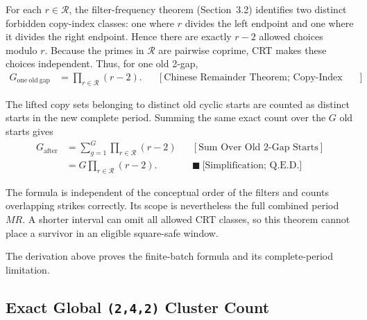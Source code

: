 For each $r\in\mathcal R$, the filter-frequency theorem (Section~3.2)
identifies two distinct forbidden copy-index classes: one where $r$
divides the left endpoint and one where it divides the right endpoint.
Hence there are exactly $r-2$ allowed choices modulo $r$. Because the
primes in $\mathcal R$ are pairwise coprime, CRT makes these choices
independent. Thus, for one old 2-gap,
\begin{equation*}
\begin{aligned}
G_{\mathrm{one\ old\ gap}}
&=\prod_{r\in\mathcal R}(r-2).
&&[\text{Chinese Remainder Theorem; Copy-Index Filter Frequency}]
\end{aligned}
\end{equation*}

The lifted copy sets belonging to distinct old cyclic starts are counted
as distinct starts in the new complete period. Summing the same exact
count over the $G$ old starts gives
\begin{equation*}
\begin{aligned}
G_{\mathrm{after}}
&=\sum_{g=1}^{G}
  \prod_{r\in\mathcal R}(r-2)
&&[\text{Sum Over Old 2-Gap Starts}]\\
&=G\prod_{r\in\mathcal R}(r-2).
&&\blacksquare\ \text{[Simplification; Q.E.D.]}
\end{aligned}
\end{equation*}

The formula is independent of the conceptual order of the filters and
counts overlapping strikes correctly. Its scope is nevertheless the full
combined period $MR$. A shorter interval can omit all allowed CRT
classes, so this theorem cannot place a survivor in an eligible
square-safe window.

{\raggedright
The derivation above proves the finite-batch formula and its
complete-period limitation. \par}

\subsection{Exact Global \texorpdfstring{\texttt{(2,4,2)}}{(2,4,2)} Cluster Count}
\label{sec:exact-global-242-cluster-count}


